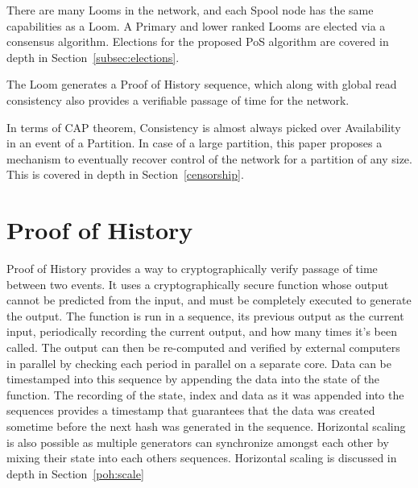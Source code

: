 \documentclass[12pt]{article}
\begin{document}
There are many Looms in the network, and each Spool node has the same capabilities as a Loom.  A Primary and lower ranked Looms are elected via a consensus algorithm. Elections for the proposed PoS algorithm are covered in depth in Section~\ref{subsec:elections}.

The Loom generates a Proof of History sequence, which along with global read consistency also provides a verifiable passage of time for the network.

In terms of CAP theorem, Consistency is almost always picked over Availability in an event of a Partition. In case of a large partition, this paper proposes a mechanism to eventually recover control of the network for a partition of any size.  This is covered in depth in Section~\ref{censorship}.

\section{Proof of History}\label{proof_of_history}

Proof of History provides a way to cryptographically verify passage of time between two events. It uses a cryptographically secure function whose output cannot be predicted from the input, and must be completely executed to generate the output. The function is run in a sequence, its previous output as the current input, periodically recording the current output, and how many times it's been called. The output can then be re-computed and verified by external computers in parallel by checking each period in parallel on a separate core. Data can be timestamped into this sequence by appending the data into the state of the function.  The recording of the state, index and data as it was appended into the sequences provides a timestamp that guarantees that the data was created sometime before the next hash was generated in the sequence. Horizontal scaling is also possible as multiple generators can synchronize amongst each other by mixing their state into each others sequences.  Horizontal scaling is discussed in depth in Section~\ref{poh:scale}\\
\end{document}
